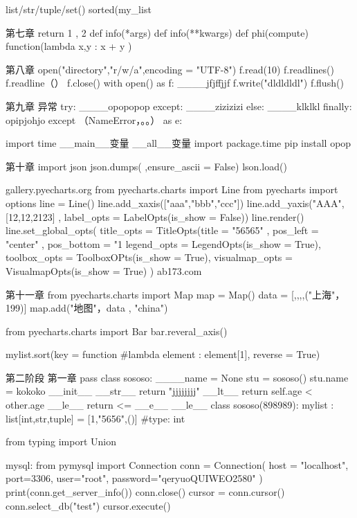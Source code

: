 list/str/tuple/set()  %
sorted(my_list%

第七章  
return 1 , 2
def info(*args) %
def info(**kwargs)  %
def phi(compute)   %
function(lambda x,y : x + y )  %

第八章
open("directory","r/w/a",encoding = "UTF-8")  %
f.read(10)  %
f.readlines()  %
f.readline（）  %
f.close()
with open() as f:  %
____jfjffjjf  
f.write("dldldldl")  %
f.flush()   %

第九章  异常
try:
____opopopop
except:
____zizizizi
else:
____klklkl
finally:
opipjohjo
except （NameError，。。） as e:  %

import time  %
__main__变量  %
__all__变量   %
import package.time
pip install opop 

第十章
import json
json.dumps(  ,ensure_ascii = False)  %
lson.load()  %

gallery.pyecharts.org   %
from pyecharts.charts import Line
from pyecharts import options
line = Line()
line.add_xaxis(["aaa","bbb","ccc"])
line.add_yaxis("AAA",[12,12,2123] , label_opts = LabelOpts(is_show = False))
line.render()
line.set_global_opts(
    title_opts = TitleOpts(title = "56565" , pos_left = "center" , pos_bottom = "1%
    legend_opts = LegendOpts(is_show = True),
    toolbox_opts = ToolboxOPts(is_show = True),
    visualmap_opts = VisualmapOpts(is_show = True)
)
ab173.com

第十一章
from pyecharts.charts import Map
map = Map()
data = [,,,,("上海"， 199)]
map.add("地图"，data , "china")

from pyecharts.charts import Bar
bar.reveral_axis()

mylist.sort(key = function #lambda element : element[1], reverse = True)

第二阶段   
第一章
pass
class sososo:   %
____name = None
stu = sososo()
stu.name = kokoko
 __init__
__str__    %
    return "jjjjjjjj"
__lt__
    return self.age < other.age
__le__
    return         <=
__e__
__le__
class sososo(898989):      %
mylist : list[int,str,tuple] = [1,"5656",()]   #type: int

from typing import Union %

mysql:
from pymysql import Connection
conn = Connection(
host = "localhost",
port=3306,
user="root",
password="qeryuoQUIWEO2580"
)
print(conn.get_server_info())
conn.close()
cursor = conn.cursor()
conn.select_db("test")
cursor.execute()



